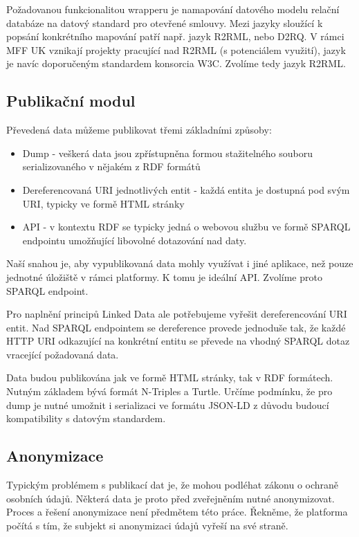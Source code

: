 Požadovanou funkcionalitou wrapperu je namapování datového modelu relační databáze na datový standard pro otevřené smlouvy. Mezi jazyky sloužící k popsání konkrétního mapování patří např. jazyk R2RML\cite{R2RML}, nebo D2RQ\cite{D2RQ}. V rámci MFF UK vznikají projekty pracující nad R2RML (s potenciálem využití), jazyk je navíc doporučeným standardem konsorcia W3C. Zvolíme tedy jazyk R2RML.

\subsection*{Publikační modul}

Převedená data můžeme publikovat třemi základními způsoby:

\begin{itemize}
\item Dump - veškerá data jsou zpřístupněna formou stažitelného souboru serializovaného v nějakém z RDF formátů
\item Dereferencovaná URI jednotlivých entit - každá entita je dostupná pod svým URI, typicky ve formě HTML stránky
\item API - v kontextu RDF se typicky jedná o webovou službu ve formě SPARQL endpointu umožňující libovolné dotazování nad daty.
\end{itemize}

Naší snahou je, aby vypublikovaná data mohly využívat i jiné aplikace, než pouze jednotné úložiště v rámci platformy. K tomu je ideální API. Zvolíme proto SPARQL endpoint.

Pro naplnění principů Linked Data ale potřebujeme vyřešit dereferencování URI entit. Nad SPARQL endpointem se dereference provede jednoduše tak, že každé HTTP URI odkazující na konkrétní entitu se převede na vhodný SPARQL dotaz vracející požadovaná data. 

Data budou publikována jak ve formě HTML stránky, tak v RDF formátech. Nutným základem bývá formát N-Triples a Turtle. Určíme podmínku, že pro dump je nutné umožnit i serializaci ve formátu JSON-LD z důvodu budoucí kompatibility s datovým standardem.

\subsection*{Anonymizace} 

Typickým problémem s publikací dat je, že mohou podléhat zákonu o ochraně osobních údajů\cite{z101}. Některá data je proto před zveřejněním nutné anonymizovat. Proces a řešení anonymizace není předmětem této práce. Řekněme, že platforma počítá s tím, že subjekt si anonymizaci údajů vyřeší na své straně.

